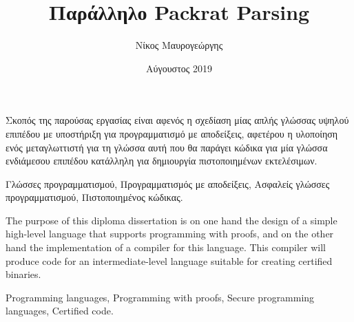 \documentclass[diploma]{softlab-thesis}
\begin{document}

\frontmatter

\title{Παράλληλο Packrat Parsing}
\author{Νίκος Μαυρογεώργης}
\date{Αύγουστος 2019}




\maketitle



\begin{abstractgr}%
  Σκοπός της παρούσας εργασίας είναι αφενός η σχεδίαση μίας απλής
  γλώσσας υψηλού επιπέδου με υποστήριξη για προγραμματισμό με
  αποδείξεις, αφετέρου η υλοποίηση ενός μεταγλωττιστή για τη γλώσσα
  αυτή που θα παράγει κώδικα για μία γλώσσα ενδιάμεσου επιπέδου
  κατάλληλη για δημιουργία πιστοποιημένων εκτελέσιμων.

\begin{keywordsgr}
  Γλώσσες προγραμματισμού,
  Προγραμματισμός με αποδείξεις,
  Ασφαλείς γλώσσες προγραμματισμού,
  Πιστοποιημένος κώδικας.
\end{keywordsgr}
\end{abstractgr}



\begin{abstracten}%
  The purpose of this diploma dissertation is on one hand the design
  of a simple high-level language that supports programming with
  proofs, and on the other hand the implementation of a compiler for
  this language. This compiler will produce code for an
  intermediate-level language suitable for creating certified
  binaries.

  \begin{keywordsen}
  Programming languages,
  Programming with proofs,
  Secure programming languages,
  Certified code.
\end{keywordsen}
\end{abstracten}
\end{document}
